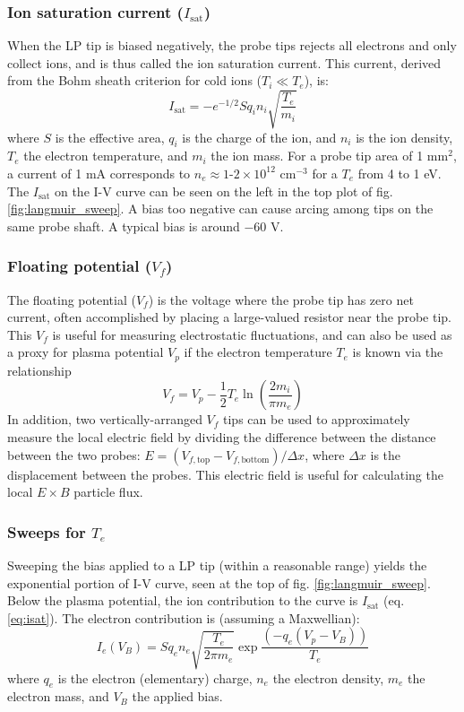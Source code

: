 \subsubsection{Ion saturation current ($I_\text{sat}$)}
When the LP tip is biased negatively, the probe tips rejects all electrons and only collect ions, and is thus called the ion saturation current. This current, derived from the Bohm sheath criterion for cold ions ($T_i \ll T_e$), is: 
\begin{equation}
	I_\text{sat} = -e^{-1/2} S q_i n_i \sqrt{\frac{T_e}{m_i}}
	\label{eq:isat}
\end{equation}
where $S$ is the effective area, $q_i$ is the charge of the ion, and $n_i$ is the ion density, $T_e$ the electron temperature, and $m_i$ the ion mass.
For a probe tip area of 1 mm$^2$, a current of 1 mA corresponds to $n_e \approx 1\text{-}2\times 10^{12}$ cm$^{-3}$ for a $T_e$ from 4 to 1 eV. The $I_\text{sat}$ on the I-V curve can be seen on the left in the top plot of fig. \ref{fig:langmuir_sweep}. A bias too negative can cause arcing among tips on the same probe shaft. A typical bias is around $-60$ V. 

\subsubsection{Floating potential ($V_f$)}
The floating potential ($V_f$) is the voltage where the probe tip has zero net current, often accomplished by placing a large-valued resistor near the probe tip. This $V_f$ is useful for measuring electrostatic fluctuations, and can also be used as a proxy for plasma potential $V_p$ if the electron temperature $T_e$ is known via the relationship
\begin{equation}
	V_f = V_p - \frac{1}{2} T_e \ln \left( \frac{2 m_i}{\pi m_e} \right)
\end{equation}
In addition, two vertically-arranged $V_f$ tips can be used to approximately measure the local electric field by dividing the difference between the distance between the two probes: $E = (V_{f,\text{top}} - V_{f,\text{bottom}}) / \Delta x$, where $\Delta x$ is the displacement between the probes. This electric field is useful for calculating the local $E\times B$ particle flux.

\subsubsection{Sweeps for $T_e$}
Sweeping the bias applied to a LP tip (within a reasonable range) yields the exponential portion of I-V curve, seen at the top of fig. \ref{fig:langmuir_sweep}. Below the plasma potential, the ion contribution to the curve is $I_\text{sat}$ (eq. \ref{eq:isat}). The electron contribution is (assuming a Maxwellian):
\begin{equation}
	I_e (V_B) = S q_e n_e \sqrt{\frac{T_e}{2 \pi m_e}} \exp \frac{(- q_e (V_p - V_B))}{T_e}
\end{equation}
where $q_e$ is the electron (elementary) charge, $n_e$ the electron density, $m_e$ the electron mass, and $V_B$ the applied bias.

